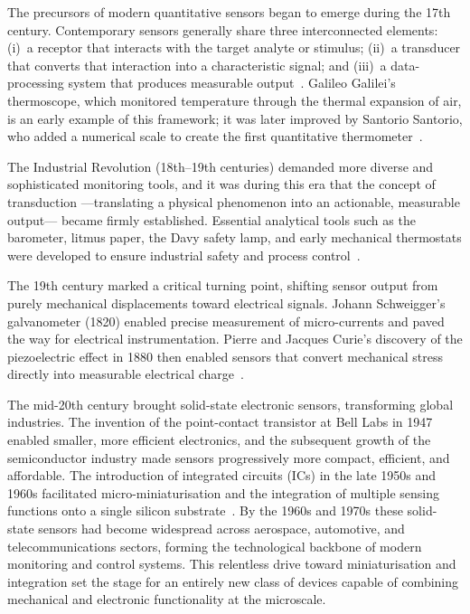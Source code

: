 The precursors of modern quantitative sensors began to emerge
during the 17th century. Contemporary sensors generally share
three interconnected elements: (i)~a receptor that interacts with
the target analyte or stimulus; (ii)~a transducer that converts
that interaction into a characteristic signal; and (iii)~a
data-processing system that produces measurable output~\cite{pirzada2023}.
Galileo Galilei's thermoscope, which monitored temperature through
the thermal expansion of air, is an early example of this
framework; it was later improved by Santorio Santorio, who added a
numerical scale to create the first quantitative
thermometer~\cite{middleton1966}.

The Industrial Revolution (18th--19th centuries) demanded more
diverse and sophisticated monitoring tools, and it was during this
era that the concept of transduction ---translating a physical
phenomenon into an actionable, measurable output--- became firmly
established. Essential analytical tools such as the barometer,
litmus paper, the Davy safety lamp, and early mechanical
thermostats were developed to ensure industrial safety and process
control~\cite{pirzada2023,duncan1947}.

The 19th century marked a critical turning point, shifting
sensor output from purely mechanical displacements toward
electrical signals. Johann Schweigger's galvanometer (1820)
enabled precise measurement of micro-currents and paved the way
for electrical instrumentation. Pierre and Jacques Curie's
discovery of the piezoelectric effect in 1880 then enabled
sensors that convert mechanical stress directly into measurable
electrical charge~\cite{curie1880}.

The mid-20th century brought solid-state electronic sensors,
transforming global industries. The invention of the
point-contact transistor at Bell Labs in 1947~\cite{bardeen1948}
enabled smaller, more efficient electronics, and the subsequent
growth of the semiconductor industry made sensors progressively
more compact, efficient, and affordable. The introduction of
integrated circuits (ICs) in the late 1950s and 1960s
facilitated micro-miniaturisation and the integration of
multiple sensing functions onto a single silicon
substrate~\cite{kilby1976}. By the 1960s and 1970s these
solid-state sensors had become widespread across aerospace,
automotive, and telecommunications sectors, forming the
technological backbone of modern monitoring and control systems.
This relentless drive toward miniaturisation and integration set
the stage for an entirely new class of devices capable of
combining mechanical and electronic functionality at the
microscale.

